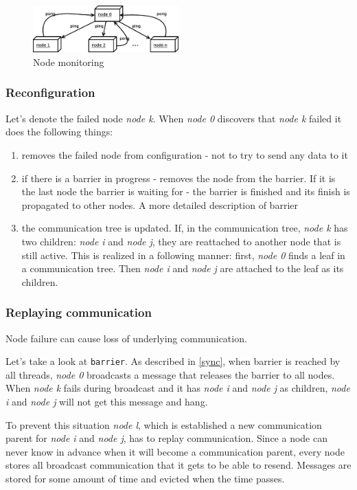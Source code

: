 \documentclass{llncs}
\newcommand{\inlinecode}{\texttt}
\begin{document}
\begin{figure}
  \centering
      \includegraphics[width=0.5\textwidth]{node-monitoring.eps}
  \caption{Node monitoring}
  \label{pinging}
\end{figure}

\subsubsection{Reconfiguration}
Let's denote the failed node \emph{node k}.
When \emph{node 0} discovers that \emph{node k} failed it does the following things:
\begin{enumerate}
\item removes the failed node from configuration - not to try to send any data to it
\item if there is a barrier in progress - removes the node from the barrier.
If it is the last node the barrier is waiting for - the barrier is finished and its finish is propagated to other nodes. A more detailed description of barrier   %
\item the communication tree is updated. If, in the communication tree, \emph{node k} has two children: \emph{node i} and \emph{node j},
  they are reattached to another node that is still active. This is realized in a following manner: first, \emph{node 0} finds a leaf in a communication tree.
  Then \emph{node i} and \emph{node j} are attached to the leaf as its children.
\end{enumerate}

\subsubsection{Replaying communication}
Node failure can cause loss of underlying communication.

Let's take a look at \inlinecode{barrier}.
As described in \ref{sync}, when barrier is reached by all threads, \emph{node 0} broadcasts a message that releases the barrier to all nodes.
When \emph{node k} fails during broadcast and it has \emph{node i} and \emph{node j} as children, \emph{node i} and \emph{node j} will not get this message and hang.

To prevent this situation \emph{node l}, which is established a new communication parent for \emph{node i} and \emph{node j}, has to replay communication.
Since a node can never know in advance when it will become a communication parent, every node stores all broadcast communication that it gets to be able to resend.
Messages are stored for some amount of time and evicted when the time passes.
\end{document}
